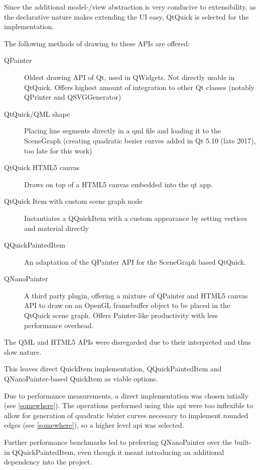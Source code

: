 Since the additional model-/view abstraction is very conducive to extensibility, as the declarative nature makes extending the UI easy, QtQuick is selected for the implementation.


The following methods of drawing to these APIs are offered:
\begin{description}
	\item [QPainter] Oldest drawing API of Qt, used in QWidgets. Not directly usable in QtQuick. Offers highest amount of integration to other Qt classes (notably QPrinter and QSVGGenerator)
	\item [QtQuick/QML shape] Placing line segments directly in a \gls{qml} file and loading it to the SceneGraph (creating quadratic bezier curves added in Qt 5.10 (late 2017), too late for this work)
	\item [QtQuick HTML5 canvas] Draws on top of a HTML5 canvas embedded into the qt app.
	\item [QtQuick Item with custom scene graph node] Instantiates a QQuickItem with a custom appearance by setting vertices and material directly
	\item [QQuickPaintedItem] An adaptation of the QPainter API for the SceneGraph based QtQuick. 
	\item [QNanoPainter] A third party plugin, offering a mixture of QPainter and HTML5 canvas API to draw on an OpenGL framebuffer object to be placed in the QtQuick scene graph. Offers Painter-like productivity with less performance overhead.
\end{description}

The QML and HTML5 APIs were disregarded due to their interpreted and thus slow nature.

This leaves direct QuickItem implementation, QQuickPaintedItem and QNanoPainter-based QuickItem as viable options.

Due to performance measurements, a direct implementation was chosen intially (see \ref{somewhere}). The operations performed using this \gls{api} were too inflexible to allow for generation of quadratic bézier curves necessary to implement rounded edges (see \ref{somewhere}), so a higher level \gls{api} was selected.

Further performance benchmarks led to preferring QNanoPainter over the built-in QQuickPaintedItem, even though it meant introducing an additional dependency into the project.

